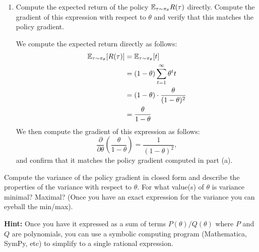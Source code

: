 \documentclass{article}
\begin{document}
\begin{enumerate}
\begin{enumerate}
    \item \label{exact_gradient} Compute the expected return of the policy $\mathbb{E}_{\tau \sim \pi_\theta} R(\tau)$ directly. Compute the gradient of this expression with respect to $\theta$ and verify that this matches the policy gradient.

    \begin{sol}
We compute the expected return directly as follows:
\begin{align*}
    \mathbb{E}_{\tau \sim \pi_\theta} [R(\tau)] &= \mathbb{E}_{\tau \sim \pi_\theta}[t] \\
    &= (1 - \theta) \sum_{t=1}^\infty \theta^t t \\
    &= (1 - \theta) \cdot \frac{\theta}{(1 - \theta)^2} \\
    &= \frac{\theta}{1 - \theta}
\end{align*}
We then compute the gradient of this expression as follows:
\[\frac{\partial}{\partial \theta} \left(\frac{\theta}{1 - \theta}\right) = \frac{1}{(1 - \theta)^2},\]
and confirm that it matches the policy gradient computed in part (a).
    
    \end{sol}

\end{enumerate}
\newpage
{} Compute the variance of the policy gradient in closed form and describe the properties of the variance with respect to $\theta$. For what value(s) of $\theta$ is variance minimal? Maximal? (Once you have an exact expression for the variance you can eyeball the min/max).

\textbf{Hint:}  Once you have it expressed as a sum of terms $P(\theta)/Q(\theta)$ where $P$ and $Q$ are polynomials, you can use a symbolic computing program (Mathematica, SymPy, etc) to simplify to a single rational expression.


\end{enumerate}
\end{document}
